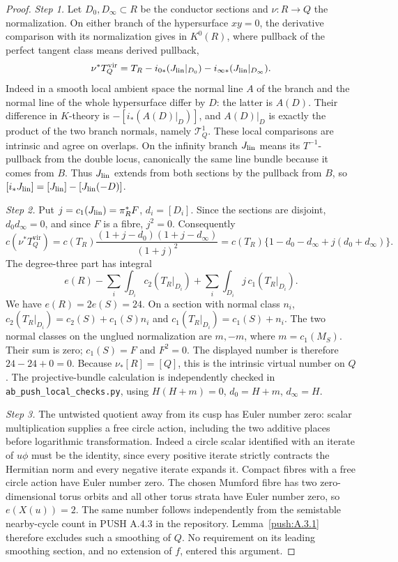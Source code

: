 \begin{proof}
\par\noindent\textit{Step 1.} Let $D_0,D_\infty\subset R$ be the conductor sections and
$\nu:R\to Q$ the normalization. On either branch of the
hypersurface $xy=0$, the derivative comparison with its
normalization gives in $K^0(R)$, where pullback of the
perfect tangent class means derived pullback,
\[
 \nu^*T_Q^{\mathrm{vir}}
 =T_R-i_{0*}(J_{\rm lin}|_{D_0})-i_{\infty*}(J_{\rm lin}|_{D_\infty}).
\]
Indeed in a smooth local ambient space the normal line $A$ of
the branch and the normal line of the whole hypersurface
differ by $D$: the latter is $A(D)$. Their difference in
$K$-theory is $-[i_*(A(D)|_D)]$, and $A(D)|_D$ is exactly
the product of the two branch normals, namely $\mathcal T^1_Q$.
These local comparisons are intrinsic and agree on overlaps.
On the infinity branch $J_{\rm lin}$ means its $T^{-1}$-pullback
from the double locus, canonically the same line bundle
because it comes from $B$. Thus $J_{\rm lin}$ extends from both sections by the pullback from $B$,
so $[i_*J_{\rm lin}]=[J_{\rm lin}]-[J_{\rm lin}(-D)]$.

\par\noindent\textit{Step 2.} Put $j=c_1(J_{\rm lin})=\pi_R^*F$, $d_i=[D_i]$. Since the sections are
disjoint, $d_0d_\infty=0$, and since $F$ is a fibre, $j^2=0$.
Consequently
\[
 c(\nu^*T_Q^{\mathrm{vir}})
 =c(T_R)\frac{(1+j-d_0)(1+j-d_\infty)}{(1+j)^2}
 =c(T_R)\{1-d_0-d_\infty+j(d_0+d_\infty)\}.
\]
The degree-three part has integral
\[
 e(R)-\sum_i\int_{D_i}c_2(T_R|_{D_i})
       +\sum_i\int_{D_i}j\,c_1(T_R|_{D_i}).
\]
We have $e(R)=2e(S)=24$. On a section with normal class
$n_i$, $c_2(T_R|_{D_i})=c_2(S)+c_1(S)n_i$ and
$c_1(T_R|_{D_i})=c_1(S)+n_i$. The two normal classes on
the unglued normalization are $m,-m$, where $m=c_1(M_S)$.
Their sum is zero; $c_1(S)=F$ and $F^2=0$. The displayed
number is therefore $24-24+0=0$. Because
$\nu_*[R]=[Q]$, this is the intrinsic virtual number on $Q$.
The projective-bundle calculation is independently checked
in \texttt{ab\_push\_local\_checks.py}, using
$H(H+m)=0$, $d_0=H+m$, $d_\infty=H$.

\par\noindent\textit{Step 3.} The untwisted quotient away from its cusp has Euler number zero:
scalar multiplication supplies a free circle action, including
the two additive places before logarithmic transformation. Indeed
a circle scalar identified with an iterate of $u\phi$ must be
the identity, since every positive iterate strictly contracts
the Hermitian norm and every negative iterate expands it.
Compact fibres with a free circle action have Euler number zero.
The chosen Mumford fibre has two zero-dimensional torus orbits
and all other torus strata have Euler number zero, so
$e(X(u))=2$. The same number follows independently from the
semistable nearby-cycle count in PUSH A.4.3 in the repository. Lemma~\ref{push:A.3.1}
therefore excludes such a smoothing of $Q$. No requirement
on its leading smoothing section, and no extension of $f$,
entered this argument.


\end{proof}
